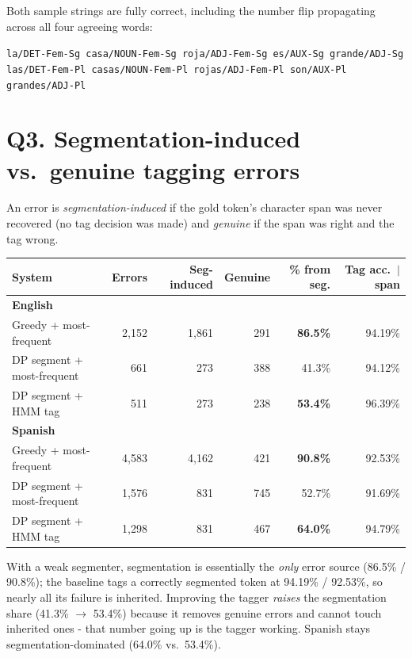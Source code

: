 \documentclass[11pt,a4paper]{article}
\begin{document}
\medskip\noindent Both sample strings are fully correct, including the number
flip propagating across all four agreeing words:

\begin{center}
\texttt{la/DET-Fem-Sg casa/NOUN-Fem-Sg roja/ADJ-Fem-Sg es/AUX-Sg grande/ADJ-Sg}\\
\texttt{las/DET-Fem-Pl casas/NOUN-Fem-Pl rojas/ADJ-Fem-Pl son/AUX-Pl grandes/ADJ-Pl}
\end{center}

\section*{Q3. Segmentation-induced vs.\ genuine tagging errors}

An error is \emph{segmentation-induced} if the gold token's character span was
never recovered (no tag decision was made) and \emph{genuine} if the span was
right and the tag wrong.

\begin{center}
\begin{tabular}{lrrrrr}
\toprule
System & Errors & Seg-induced & Genuine & \% from seg. & Tag acc.\ $|$ span \\
\midrule
\multicolumn{6}{l}{\textbf{English}} \\
Greedy + most-frequent & 2{,}152 & 1{,}861 & 291 & \textbf{86.5\%} & 94.19\% \\
DP segment + most-frequent & 661 & 273 & 388 & 41.3\% & 94.12\% \\
DP segment + HMM tag & 511 & 273 & 238 & \textbf{53.4\%} & 96.39\% \\
\multicolumn{6}{l}{\textbf{Spanish}} \\
Greedy + most-frequent & 4{,}583 & 4{,}162 & 421 & \textbf{90.8\%} & 92.53\% \\
DP segment + most-frequent & 1{,}576 & 831 & 745 & 52.7\% & 91.69\% \\
DP segment + HMM tag & 1{,}298 & 831 & 467 & \textbf{64.0\%} & 94.79\% \\
\bottomrule
\end{tabular}
\end{center}

\noindent With a weak segmenter, segmentation is essentially the \emph{only}
error source (86.5\% / 90.8\%); the baseline tags a correctly segmented token at
94.19\% / 92.53\%, so nearly all its failure is inherited. Improving the tagger
\emph{raises} the segmentation share (41.3\% $\rightarrow$ 53.4\%) because it
removes genuine errors and cannot touch inherited ones - that number going up
is the tagger working. Spanish stays segmentation-dominated (64.0\% vs.\ 53.4\%).
\end{document}
